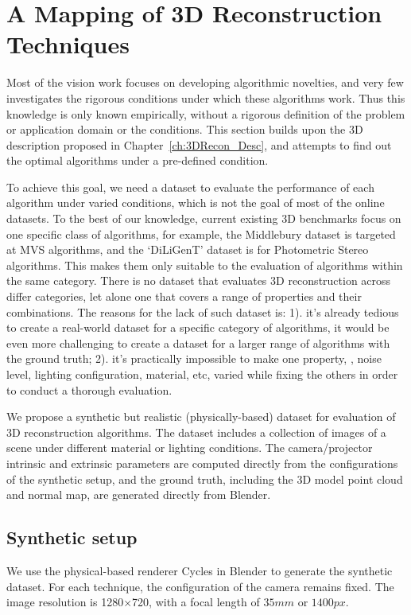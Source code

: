 
\chapter{A Mapping of 3D Reconstruction Techniques}
\label{ch:3DRecon_Mapping}
Most of the vision work focuses on developing algorithmic novelties, and very few investigates the rigorous conditions under which these algorithms work. Thus this knowledge is only known empirically, without a rigorous definition of the problem or application domain or the conditions. This section builds upon the 3D description proposed in Chapter~\ref{ch:3DRecon_Desc}, and attempts to find out the optimal algorithms under a pre-defined condition.

To achieve this goal, we need a dataset to evaluate the performance of each algorithm under varied conditions, which is not the goal of most of the online datasets. To the best of our knowledge, current existing 3D benchmarks focus on one specific class of algorithms, for example, the Middlebury dataset is targeted at MVS algorithms, and the `DiLiGenT' dataset is for Photometric Stereo algorithms. This makes them only suitable to the evaluation of algorithms within the same category. There is no dataset that evaluates 3D reconstruction across differ categories, let alone one that covers a range of properties and their combinations. The reasons for the lack of such dataset is: 1). it's already tedious to create a real-world dataset for a specific category of algorithms, it would be even more challenging to create a dataset for a larger range of algorithms with the ground truth; 2). it's practically impossible to make one property, \eg, noise level, lighting configuration, material, etc, varied while fixing the others in order to conduct a thorough evaluation.

We propose a synthetic but realistic (physically-based) dataset for evaluation of 3D reconstruction algorithms. The dataset includes a collection of images of a scene under different material or lighting conditions. The camera/projector intrinsic and extrinsic parameters are computed directly from the configurations of the synthetic setup, and the ground truth, including the 3D model point cloud and normal map, are generated directly from Blender.

\section{Synthetic setup}
We use the physical-based renderer Cycles in Blender to generate the synthetic dataset. For each technique, the configuration of the camera remains fixed. The image resolution is 1280$\times$720, with a focal length of $35mm$ or $1400px$.

